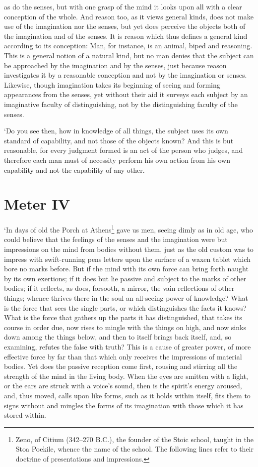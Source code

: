 as do the senses, but with one grasp of the mind it looks upon all
with a clear conception of the whole. And reason too, as it views
general kinds, does not make use of the imagination nor the senses,
but yet does perceive the objects both of the imagination and of the
senses. It is reason which thus defines a general kind according to
its conception: Man, for instance, is an animal, biped and reasoning.
This is a general notion of a natural kind, but no man denies that the
subject can be approached by the imagination and by the senses, just
because reason investigates it by a reasonable conception and not by
the imagination or senses. Likewise, though imagination takes its
beginning of seeing and forming appearances from the senses, yet
without their aid it surveys each subject by an imaginative faculty of
distinguishing, not by the distinguishing faculty of the senses.

`Do you see then, how in knowledge of all things, the subject uses its
own standard of capability, and not those of the objects known? And
this is but reasonable, for every judgment formed is an act of the
person who judges, and therefore each man must of necessity perform
 his own action from his own capability and not the
capability of any other.

\section*{Meter IV}

`In days of old the Porch at Athens\footnote{Zeno, of Citium (342--270
\textsc{B.C.}), the founder of the Stoic school, taught in the Stoa
Poekile, whence the name of the school. The following lines refer to
their doctrine of presentations and impressions.} gave us men, seeing
dimly as in old age, who could believe that the feelings of the senses
and the imagination were but impressions on the mind from bodies
without them, just as the old custom was to impress with swift-running
pens letters upon the surface of a waxen tablet which bore no marks
before. But if the mind with its own force can bring forth naught by
its own exertions; if it does but lie passive and subject to the marks
of other bodies; if it reflects, as does, forsooth, a mirror, the vain
reflections of other things; whence thrives there in the soul an
all-seeing power of knowledge? What is the force that sees the single
parts, or which distinguishes the facts it knows? What is the force
that gathers up the parts it has distinguished, that takes its course
in order due, now rises to mingle with the things on high, and now
sinks down among the things below, and then to itself brings back
itself, and, so examining, refutes the false with truth? This is a
cause of greater power, of more effective force by far than that which
only receives the impressions of material bodies. Yet does the passive
reception come first, rousing and stirring  all the strength
of the mind in the living body. When the eyes are smitten with a
light, or the ears are struck with a voice's sound, then is the
spirit's energy aroused, and, thus moved, calls upon like forms, such
as it holds within itself, fits them to signs without and mingles the
forms of its imagination with those which it has stored within.

